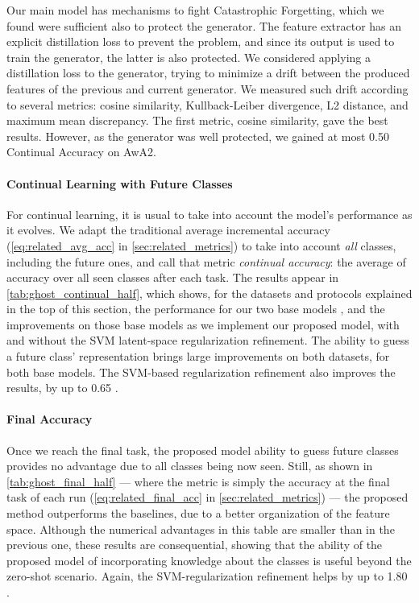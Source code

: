 Our main model has mechanisms to fight Catastrophic Forgetting, which we found were sufficient also
to protect the generator. The feature extractor has an explicit distillation loss to prevent the
problem, and since its output is used to train the generator, the latter is also protected. We
considered applying a distillation loss to the generator, trying to minimize a drift between the
produced features of the previous and current generator. We measured such drift according to several
metrics: cosine similarity, Kullback-Leiber divergence, L2 distance, and maximum mean discrepancy.
The first metric, cosine similarity, gave the best results. However, as the generator was well
protected, we gained at most 0.50 Continual Accuracy \pp on AwA2.





\paragraph{Continual Learning with Future Classes}
For continual learning, it is usual to take into account the model's performance as it evolves. We
adapt the traditional average incremental accuracy \citep{rebuffi2017icarl}
(\autoref{eq:related_avg_acc} in \autoref{sec:related_metrics}) to take into account \textit{all}
classes, including the future ones, and call that metric \textit{continual accuracy}: the average of
accuracy over all seen classes after each task. The results appear in
\autoref{tab:ghost_continual_half}, which shows, for the datasets and protocols explained in the top
of this section, the performance for our two base models \citep{hou2019ucir,douillard2020podnet},
and the improvements on those base models as we implement our proposed model, with and without the
SVM latent-space regularization refinement. The ability to guess a future class' representation
brings large improvements on both datasets, for both base models. The SVM-based regularization
refinement also improves the results, by up to 0.65 \pp.



\paragraph{Final Accuracy} Once we reach the final task, the proposed model ability to guess future
classes provides no advantage due to all classes being now seen. Still, as shown in
\autoref{tab:ghost_final_half} — where the metric is simply the accuracy at the final task of each
run (\autoref{eq:related_final_acc} in \autoref{sec:related_metrics}) — the proposed method
outperforms the baselines, due to a better organization of the feature space. Although the numerical
advantages in this table are smaller than in the previous one, these results are consequential,
showing that the ability of the proposed model of incorporating knowledge about the classes is
useful beyond the zero-shot scenario. Again, the SVM-regularization refinement helps by up to 1.80
\pp.

